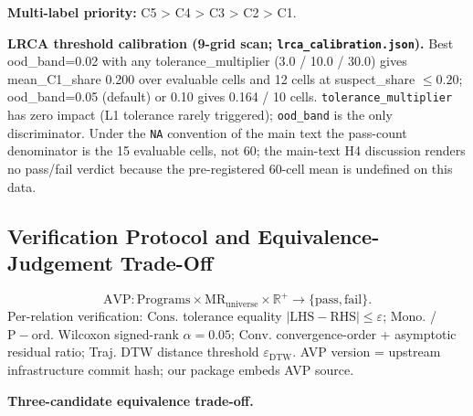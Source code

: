 \documentclass[manuscript,screen,review]{acmart}
\begin{document}
\textbf{Multi-label priority:} C5 \textgreater{} C4 \textgreater{} C3
\textgreater{} C2 \textgreater{} C1.

\textbf{LRCA threshold calibration (9-grid scan;
\texttt{lrca\_calibration.json}).} Best ood\_band=0.02 with any
tolerance\_multiplier (3.0 / 10.0 / 30.0) gives mean\_C1\_share 0.200
over evaluable cells and 12 cells at suspect\_share $\leq 0.20$;
ood\_band=0.05 (default) or 0.10 gives 0.164 / 10 cells.
\texttt{tolerance\_multiplier} has zero impact (L1 tolerance
rarely triggered); \texttt{ood\_band} is the only discriminator. Under
the \texttt{NA} convention of the main text the pass-count denominator
is the 15 evaluable cells, not 60; the main-text H4 discussion renders
no pass/fail verdict because the pre-registered 60-cell mean is
undefined on this data.

\subsection{Verification Protocol and Equivalence-Judgement Trade-Off}\label{a.3-avp-protocol-specification-and-equivalence-judgement-trade-off}

\[
\mathrm{AVP}: \mathrm{Programs} \times \mathrm{MR}_{\mathrm{universe}} \times \mathbb{R}^{+} \to \{\mathrm{pass}, \mathrm{fail}\}.
\]
Per-relation verification: $\mathrm{Cons.}$ tolerance equality $|\mathrm{LHS} -
\mathrm{RHS}| \leq \varepsilon$; $\mathrm{Mono.}$ / $\mathrm{P-ord.}$ Wilcoxon signed-rank $\alpha=0.05$; $\mathrm{Conv.}$
convergence-order + asymptotic residual ratio; Traj. DTW distance
threshold $\varepsilon_{\mathrm{DTW}}$. AVP version = upstream infrastructure commit hash; our package embeds
AVP source.

\textbf{Three-candidate equivalence trade-off.}
\end{document}

